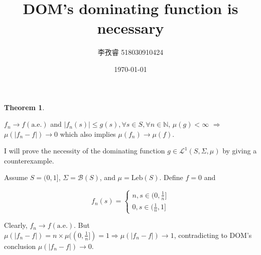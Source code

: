\documentclass{article}
\title{DOM's dominating function is necessary}
\author{李孜睿 518030910424}
\date{\today}
\newtheorem{theorem}{Theorem}
\begin{document}
	\maketitle
	\begin{tcolorbox}
	\begin{theorem}
	\end{theorem}
	
	$f_n \rightarrow f(\text{a.e.})$  and $|f_n(s)|\leq g(s),\forall s\in S,\forall n\in\mathbb{N}$, $\mu(g)<\infty$ $\Rightarrow$ $\mu(|f_n-f|)\rightarrow 0$ which also implies $\mu(f_n)\rightarrow\mu(f)$.
	\end{tcolorbox}
	
	
	
	I will prove the necessity of the dominating function $g\in\mathcal{L}^1(S,\Sigma,\mu)$ by giving a counterexample.
	
	
	
	Assume $S=(0, 1]$,  $\Sigma=\mathcal{B}(S)$, and $\mu=\text{Leb}(S)$. Define $f=0$ and
	
	$$
	f_n(s)=\left\{
	\begin{array}{lr}
	n, s\in(0,\frac1n]\\
	0, s\in(\frac1n,1]
	\end{array}
	\right.
	$$
	
	Clearly, $f_n\rightarrow f(\text{a.e.})$. But $\mu(|f_n-f|)=n\times\mu((0,\frac1n])=1\Rightarrow\mu(|f_n-f|)\rightarrow 1$, contradicting to DOM's conclusion $\mu(|f_n-f|)\rightarrow 0$.	
\end{document}
